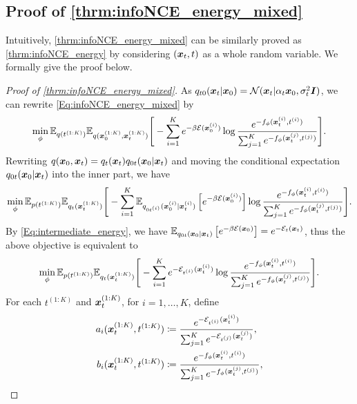 \subsection{Proof of \cref{thrm:infoNCE_energy_mixed}}
\label{appendix:proof_mixed}
Intuitively, \cref{thrm:infoNCE_energy_mixed} can be similarly proved as \cref{thrm:infoNCE_energy} by considering $({\bm{x}}_t,t)$ as a whole random variable. We formally give the proof below.

\begin{proof}[Proof of \cref{thrm:infoNCE_energy_mixed}]
As $q_{t0}({\bm{x}}_t|{\bm{x}}_0)=\mathcal N({\bm{x}}_t|\alpha_t{\bm{x}}_0,\sigma_t^2\bm{I})$, we can rewrite \eqref{Eq:infoNCE_energy_mixed} by
\begin{equation*}
    \min_\phi \mathbb{E}_{q(t^{(1:K)})}\mathbb{E}_{q({\bm{x}}_0^{(1:K)},{\bm{x}}_t^{(1:K)})}\Bigg[
    - \sum_{i=1}^K
     e^{-\beta{\mathcal{E}}({\bm{x}}_0^{(i)})}
    \log \frac{e^{-f_\phi({\bm{x}}_t^{(i)},t^{(i)})}}{\sum_{j=1}^K e^{-f_\phi({\bm{x}}_t^{(j)},t^{(j)})}}
\Bigg].
\end{equation*}
Rewriting $q({\bm{x}}_0,{\bm{x}}_t) = q_t({\bm{x}}_t)q_{0t}({\bm{x}}_0|{\bm{x}}_t)$ and moving the conditional expectation $q_{0t}({\bm{x}}_0|{\bm{x}}_t)$ into the inner part, we have
\begin{equation*}
    \min_\phi \mathbb{E}_{p(t^{(1:K)})}\mathbb{E}_{q_t({\bm{x}}_t^{(1:K)})}\Bigg[
    - \sum_{i=1}^K
    \mathbb{E}_{q_{0t^{(i)}}({\bm{x}}_0^{(i)}|{\bm{x}}_t^{(i)})}\left[ e^{-\beta{\mathcal{E}}({\bm{x}}_0^{(i)})} \right]
    \log \frac{e^{-f_\phi({\bm{x}}_t^{(i)},t^{(i)})}}{\sum_{j=1}^K e^{-f_\phi({\bm{x}}_t^{(j)},t^{(j)})}}
\Bigg].    
\end{equation*}
By \eqref{Eq:intermediate_energy}, we have $\mathbb{E}_{q_{0t}({\bm{x}}_0|{\bm{x}}_t)}\left[ e^{-\beta{\mathcal{E}}({\bm{x}}_0)} \right] = e^{-{\mathcal{E}}_t({\bm{x}}_t)}$, thus the above objective is equivalent to
\begin{equation}
\label{Eq:appendix_proof_objective_mixed}
    \min_\phi \mathbb{E}_{p(t^{(1:K)})}\mathbb{E}_{q_t({\bm{x}}_t^{(1:K)})}\Bigg[
    - \sum_{i=1}^K
    e^{-{\mathcal{E}}_{t^{(i)}}({\bm{x}}_t^{(i)})}
    \log \frac{e^{-f_\phi({\bm{x}}_t^{(i)},t^{(i)})}}{\sum_{j=1}^K e^{-f_\phi({\bm{x}}_t^{(j)},t^{(j)})}}
\Bigg].
\end{equation}
For each $t^{(1:K)}$ and ${\bm{x}}_t^{(1:K)}$, for $i=1,\dots,K$, define
\begin{equation*}
\begin{split}
    a_i(\x_t^{(1:K)}, t^{(1:K)}) &\coloneqq  \frac{e^{-\gE_{t^{(i)}}(\x_t^{(i)})}}{\sum_{j=1}^K e^{-\gE_{t^{(j)}}(\x_t^{(j)})}}, \\
    b_i(\x_t^{(1:K)}, t^{(1:K)}) &\coloneqq \frac{e^{-f_\phi(\x_t^{(i)},t^{(i)})}}{\sum_{j=1}^K e^{-f_\phi(\x_t^{(j)},t^{(j)})}}, \\

\end{split}
\end{equation*}
\end{proof}
